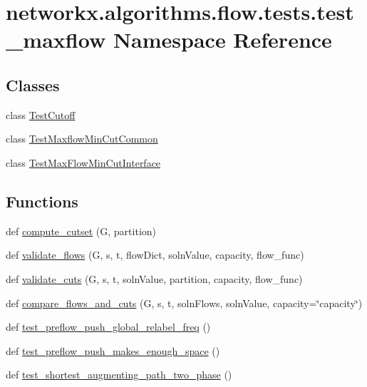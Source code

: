 \hypertarget{namespacenetworkx_1_1algorithms_1_1flow_1_1tests_1_1test__maxflow}{}\section{networkx.\+algorithms.\+flow.\+tests.\+test\+\_\+maxflow Namespace Reference}
\label{namespacenetworkx_1_1algorithms_1_1flow_1_1tests_1_1test__maxflow}
\subsection*{Classes}
\begin{DoxyCompactItemize}
\item 
class \hyperlink{classnetworkx_1_1algorithms_1_1flow_1_1tests_1_1test__maxflow_1_1TestCutoff}{Test\+Cutoff}
\item 
class \hyperlink{classnetworkx_1_1algorithms_1_1flow_1_1tests_1_1test__maxflow_1_1TestMaxflowMinCutCommon}{Test\+Maxflow\+Min\+Cut\+Common}
\item 
class \hyperlink{classnetworkx_1_1algorithms_1_1flow_1_1tests_1_1test__maxflow_1_1TestMaxFlowMinCutInterface}{Test\+Max\+Flow\+Min\+Cut\+Interface}
\end{DoxyCompactItemize}
\subsection*{Functions}
\begin{DoxyCompactItemize}
\item 
def \hyperlink{namespacenetworkx_1_1algorithms_1_1flow_1_1tests_1_1test__maxflow_a85d975b82fb1c2dfb5d3e9de2cb0e2dd}{compute\+\_\+cutset} (G, partition)
\item 
def \hyperlink{namespacenetworkx_1_1algorithms_1_1flow_1_1tests_1_1test__maxflow_a381efcf1f2e3a8633bd121545f297e2d}{validate\+\_\+flows} (G, s, t, flow\+Dict, soln\+Value, capacity, flow\+\_\+func)
\item 
def \hyperlink{namespacenetworkx_1_1algorithms_1_1flow_1_1tests_1_1test__maxflow_a5e012de15efb319d2f1e45cd6883cc4d}{validate\+\_\+cuts} (G, s, t, soln\+Value, partition, capacity, flow\+\_\+func)
\item 
def \hyperlink{namespacenetworkx_1_1algorithms_1_1flow_1_1tests_1_1test__maxflow_a466ff856a4ac0918bc79cb752539fb7d}{compare\+\_\+flows\+\_\+and\+\_\+cuts} (G, s, t, soln\+Flows, soln\+Value, capacity=\char`\"{}capacity\char`\"{})
\item 
def \hyperlink{namespacenetworkx_1_1algorithms_1_1flow_1_1tests_1_1test__maxflow_aa113886740c8feaf949dac9140c33297}{test\+\_\+preflow\+\_\+push\+\_\+global\+\_\+relabel\+\_\+freq} ()
\item 
def \hyperlink{namespacenetworkx_1_1algorithms_1_1flow_1_1tests_1_1test__maxflow_a4abc0138845bd85d5b427118105e65de}{test\+\_\+preflow\+\_\+push\+\_\+makes\+\_\+enough\+\_\+space} ()
\item 
def \hyperlink{namespacenetworkx_1_1algorithms_1_1flow_1_1tests_1_1test__maxflow_a57f276069d486b1cea3fb3093a027499}{test\+\_\+shortest\+\_\+augmenting\+\_\+path\+\_\+two\+\_\+phase} ()
\end{DoxyCompactItemize}
